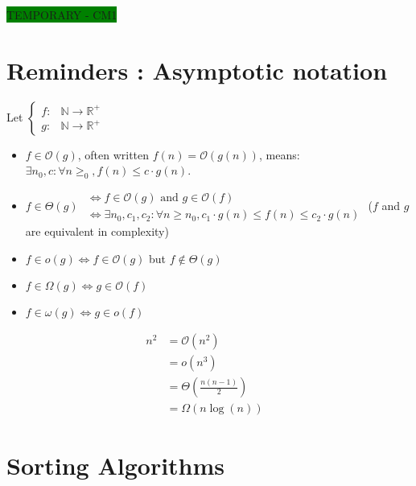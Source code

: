 \colorbox{green}{TEMPORARY - CM1}

\chapter{Reminders : Asymptotic notation}

Let 
$ \left\{
\begin{array}{ll}
f :& \mathbb{N} \rightarrow \mathbb{R}^+\\
g :& \mathbb{N} \rightarrow \mathbb{R}^+
\end{array} \right.$ 

\begin{itemize}
\renewcommand{\labelitemi}{$\bullet$}
	\item  $f \in \mathcal{O}(g)$, often written $f(n) = \mathcal{O}(g(n))$, means: $\exists n_0, c : \forall n \geq _0, f(n) \leq c \cdot g(n)$.
	\item 	
	$f \in \Theta(g)$ $\begin{array}{l} 
	   \Leftrightarrow f \in \mathcal{O}(g)  \text{ and } g \in \mathcal{O}(f) \\
	\Leftrightarrow  \exists n_0, c_1, c_2 : \forall n\geq n_0, c_1 \cdot g(n)\leq f(n) \leq c_2 \cdot g(n) 
	\end{array}$	
	($f$ and $g$ are equivalent in complexity)
\item $f \in o(g) \Leftrightarrow f \in \mathcal{O}(g)$ but $f \notin \Theta(g)$
\item  $f \in \Omega(g) \Leftrightarrow g \in \mathcal{O}(f)$
\item $f \in \omega(g) \Leftrightarrow g \in o(f)$
\end{itemize}

\vspace{0.5cm}
\begin{example}
\begin{leftbar}
\begin{align*} 
	   n^2 & = \mathcal{O}(n^2) &\\
		 & = o(n^3) &\\
		 & = \Theta \left(\frac{n (n-1)}{2}\right) &\\
		& = \Omega (n \log (n))& 
	\end{align*}
	\end{leftbar}
\end{example}


\chapter{Sorting Algorithms}

